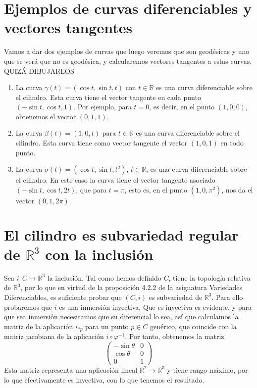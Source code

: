 \documentclass[twoside, 11pt]{article}
\theoremstyle{definition}
\newcommand{\R}{\mathbb{R}}
\begin{document}
\section{Ejemplos de curvas diferenciables y vectores tangentes}

Vamos a dar dos ejemplos de curvas que luego veremos que son geodésicas y uno que se verá que no es geodésica, y calcularemos vectores tangentes a estas curvas.  QUIZÁ DIBUJARLOS

\begin{enumerate}

\item
 La curva $\gamma(t)=(\cos t, \sin t, t)$ con $t\in\R$ es una curva diferenciable sobre el cilindro. Esta curva tiene el vector tangente en cada punto $(-\sin t,\cos t, 1)$. Por ejemplo, para $t=0$, es decir, en el punto $(1,0,0)$, obtenemos el vector $(0,1,1)$. 

\item
 La curva $\beta(t)=(1, 0, t)$ para $t\in\R$ es una curva diferenciable sobre el cilindro. Esta curva tiene como vector tangente el vector $(1,0,1)$ en todo punto.

\item La curva $\sigma(t)=(\cos t, \sin t, t^2)$, $t\in\R$, es una curva diferenciable sobre el cilindro. En este caso la curva tiene el vector tangente asociado $(-\sin t, \cos t, 2t)$, que para $t=\pi$, esto es, en el punto $(1,0,\pi^2)$, nos da el vector $(0, 1, 2\pi)$. 
\end{enumerate}



\section{El cilindro es subvariedad regular de $\R^3$ con la inclusión}

Sea $i:C\hookrightarrow \R^3$ la inclusión. Tal como hemos definido $C$, tiene la topología relativa de $\R^3$, por lo que en virtud de la proposición 4.2.2 de la asignatura Variedades Diferenciables, es suficiente probar que $(C,i)$ es subvariedad de $\R^3$. Para ello probaremos que $i$ es una inmersión inyectiva. Que es inyectiva es evidente, y para que sea inmersión necesitamos que su diferencial lo sea, así que calculamos la matriz de la aplicación $i_{*p}$ para un punto $p\in C$ genérico, que coincide con la matriz jacobiana de la aplicación $i\circ \varphi^{-1}$. Por tanto, obtenemos la matriz
\[
\begin{pmatrix}
-\sin\theta & 0 \\
\cos\theta & 0\\
0 & 1
\end{pmatrix}
\]
Esta matriz representa una aplicación lineal $\R^2\to\R^3$ y tiene rango máximo, por lo que efectivamente es inyectiva, con lo que tenemos el resultado. 
\end{document}
